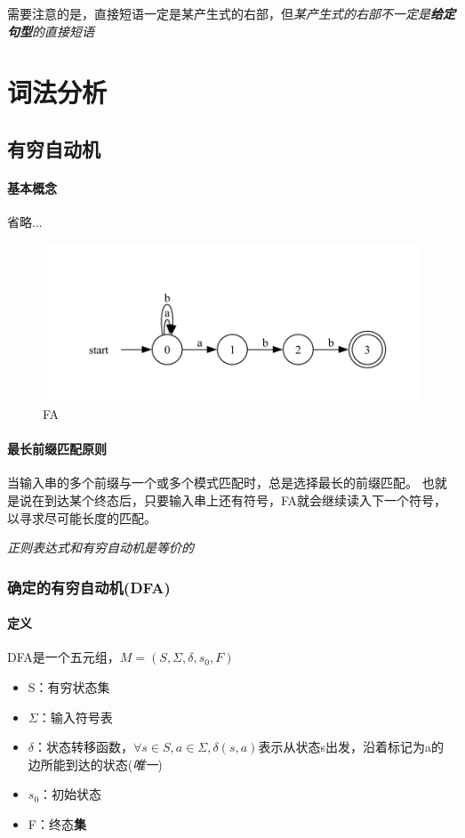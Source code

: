 \documentclass[UTF8]{ctexart} %
\begin{document}
需要注意的是，直接短语一定是某产生式的右部，但\emph{某产生式的右部不一定是\textbf{给定句型}的直接短语}

\section{词法分析}

\subsection{有穷自动机}

\paragraph{基本概念} 省略...

\begin{figure}[H]
    \centering
    \includegraphics[width=\textwidth]{assets/FA.pdf}
    \caption{FA}
\end{figure}

\paragraph{最长前缀匹配原则} 当输入串的多个前缀与一个或多个模式匹配时，总是选择最长的前缀匹配。
也就是说在到达某个终态后，只要输入串上还有符号，FA就会继续读入下一个符号，以寻求尽可能长度的匹配。

\emph{正则表达式和有穷自动机是等价的}

\subsubsection{确定的有穷自动机(DFA)}

\paragraph{定义} DFA是一个五元组，$M=(S,\Sigma,\delta,s_0,F)$

\begin{itemize}
    \item S：有穷状态集
    \item $\Sigma$：输入符号表
    \item $\delta$：状态转移函数，$\forall s\in S,a\in \Sigma,\delta(s,a)$表示从状态s出发，沿着标记为a的边所能到达的状态(\emph{唯一})
    \item $s_0$：初始状态
    \item F：终态\textbf{集}
\end{itemize}
\end{document}
